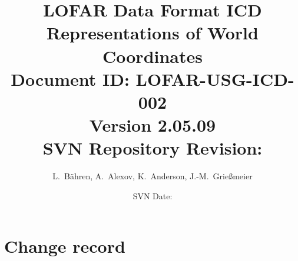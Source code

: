 \documentclass[a4paper,10pt,bibtotoc]{scrreprt}
\newcommand\icdTitle{Representations of World Coordinates}
\newcommand\icdAuthor{L.~B\"ahren, A.~Alexov, K.~Anderson, J.-M.~Grie{\ss}meier}
\newcommand\icdNumber{002}
\newcommand\icdName{LOFAR-USG-ICD-\icdNumber}
\begin{document}
\title{LOFAR Data Format ICD \\ \icdTitle \\
{\normalsize Document ID: \icdName} \\ 
{\normalsize Version 2.05.09} \\
{\normalsize SVN Repository Revision: \svnInfoMaxRevision}}
\author{\icdAuthor}
\date{\small{SVN Date: \svnInfoDate}}
\maketitle

\tableofcontents
\listoffigures
\listoftables

\clearpage


\chapter*{Change record}
\end{document}
